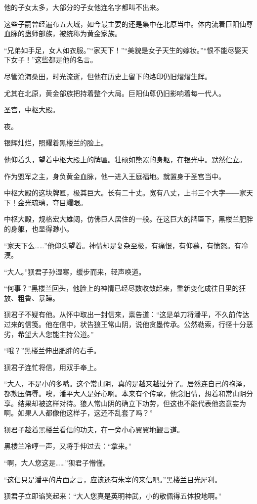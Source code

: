 \begin{this_body}
他的子女太多，大部分的子女他连名字都叫不出来。

这些子嗣曾经遍布五大域，如今最主要的还是集中在北原当中。体内流着巨阳仙尊血脉的蛊师部族，被统称为黄金家族。

“兄弟如手足，女人如衣服。”“家天下！”“美貌是女子天生的嫁妆。”“恨不能尽娶天下女子！”这些都是他的名言。

尽管沧海桑田，时光流逝，但他在历史上留下的烙印仍旧熠熠生辉。

尤其在北原，黄金部族把持着整个大局。巨阳仙尊仍旧影响着每一代人。

圣宫，中枢大殿。

夜。

银辉灿烂，照耀着黑楼兰的脸上。

他仰着头，望着中枢大殿上的牌匾。壮硕如熊罴的身躯，在银光中。默然伫立。

作为盟军之主，身负黄金血脉，他一进入王庭福地。就置身于圣宫当中。

中枢大殿的这块牌匾，极其巨大。长有二十丈。宽有八丈，上书三个大字――家天下！金光琉璃，夺目耀眼。

中枢大殿，规格宏大雄阔，仿佛巨人居住的一般。在这巨大的牌匾下，黑楼兰肥胖的身躯，也显得渺小。

“家天下么……”他仰头望着。神情却是复杂至极，有痛恨，有仰慕，有愤怒。有冷漠。

“大人。”狈君子孙湿寒，缓步而来，轻声唤道。

“何事？”黑楼兰回头，他脸上的神情已经尽数收敛起来，重新变化成往日里的狂放、粗鲁、暴躁。

狈君子不疑有他。从怀中取出一封信来，禀告道：“这是单刀将潘平，不久前传达过来的信笺。他在信中，状告狼王常山阴，说他贪墨传承。公然勒索，行径十分恶劣，希望大人您能主持公道。”

“哦？”黑楼兰伸出肥胖的右手。

狈君子连忙将信，用双手奉上。

“大人，不是小的多嘴。这个常山阴，真的是越来越过分了。居然连自己的袍泽，都欺压侮辱。唉，潘平大人是好心啊。本来有个传承，他念旧情，想着和常山阴分享。结果却被这样对待。狼人常山阴的确立下功劳，但这也不能代表他恣意妄为啊。如果人人都像他这样子，这还不乱套了吗？”

狈君子趁着黑楼兰看信的功夫，在一旁小心翼翼地觐言道。

黑楼兰冷哼一声，又将手伸过去：“拿来。”

“啊，大人您这是……”狈君子懵懂。

“这信只是潘平的片面之言，应该还有朱宰的来信吧。”黑楼兰目光犀利。

狈君子立即谄笑起来：“大人您真是英明神武，小的敬佩得五体投地啊。”


\end{this_body}
